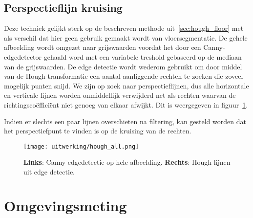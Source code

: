 \subsection{Perspectieflijn kruising}
Deze techniek gelijkt sterk op de beschreven methode uit~\ref{sec:hough_floor} met als verschil dat hier geen gebruik gemaakt wordt van vloersegmentatie.
De gehele afbeelding wordt omgezet naar grijswaarden voordat het door een Canny-edgedetector gehaald word met een variabele treshold gebaseerd op de mediaan van de grijswaarden.
De edge detectie wordt wederom gebruikt om door middel van de Hough-transformatie een aantal aanliggende rechten te zoeken die zoveel mogelijk punten snijd.
We zijn op zoek naar perspectieflijnen, dus alle horizontale en verticale lijnen worden onmiddellijk verwijderd net als rechten waarvan de richtingsco\"{e}ffici\"{e}nt
niet genoeg van elkaar afwijkt. Dit is weergegeven in figuur~\ref{fig:hough_all}.

Indien er slechts een paar lijnen overschieten na filtering, kan gesteld worden dat het perspectiefpunt te vinden is op de kruising van de rechten.

\begin{figure}
    \texttt{[image: uitwerking/hough\_all.png]}
    \caption{\textbf{Links}: Canny-edgedetectie op hele afbeelding. \textbf{Rechts}: Hough lijnen uit edge detectie.}
    \label{fig:hough_all}
\end{figure}


\section{Omgevingsmeting} \label{sec:omgevingsmeting}

